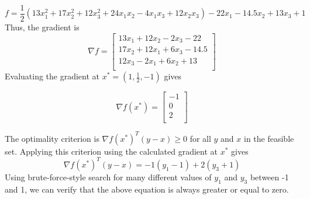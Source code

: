 \documentclass[12pt] {article}
\begin{document}
\[
f = \frac{1}{2}(13x^{2}_{1}+17x^{2}_{2}+12x^{2}_{3} +24x_{1}x_{2}-4x_{1}x_{3}+12x_{2}x_{3})-22x_{1}-14.5x_{2}+13x_{3}+1
\]
Thus, the gradient is 
\[
\nabla f = 
\left[
\begin{array}{c}
13x_1+12x_2-2x_3-22  \\
17x_2 +12x_1+6x_3-14.5  \\
12x_3-2x_1+6x_2+13\\
\end{array} 
\right]
\]
Evaluating the gradient at $x^{*}=(1,\frac{1}{2},-1)$ gives 

\[
\nabla f (x^{*})= 
\left[
\begin{array}{c}
  -1\\
   0\\
   2\\
\end{array} 
\right]
\]

The optimality criterion is $\nabla f(x^{*})^{T}(y-x) \geq 0 $ for all $y$ and $x$ in the feasible set. Applying this criterion using the calculated gradient at $x^{*}$ gives 
$$
\nabla f(x^{*})^{T}(y-x) = -1(y_1-1) + 2(y_{3}+1)
$$
Using brute-force-style search for many different values of $y_{1}$ and $y_{3}$ between -1 and 1, we can verify that the above equation is always greater or equal to zero. 
\end{document}
